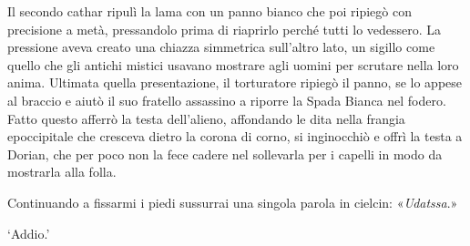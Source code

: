 Il secondo cathar ripulì la lama con un panno bianco che poi ripiegò con
precisione a metà, pressandolo prima di riaprirlo perché tutti lo
vedessero. La pressione aveva creato una chiazza simmetrica sull'altro
lato, un sigillo come quello che gli antichi mistici usavano mostrare
agli uomini per scrutare nella loro anima. Ultimata quella
presentazione, il torturatore ripiegò il panno, se lo appese al braccio
e aiutò il suo fratello assassino a riporre la Spada Bianca nel fodero.
Fatto questo afferrò la testa dell'alieno, affondando le dita nella
frangia epoccipitale che cresceva dietro la corona di corno, si
inginocchiò e offrì la testa a Dorian, che per poco non la fece cadere
nel sollevarla per i capelli in modo da mostrarla alla folla.

Continuando a fissarmi i piedi sussurrai una singola parola in cielcin:
«\emph{Udatssa}.»

`Addio.'


